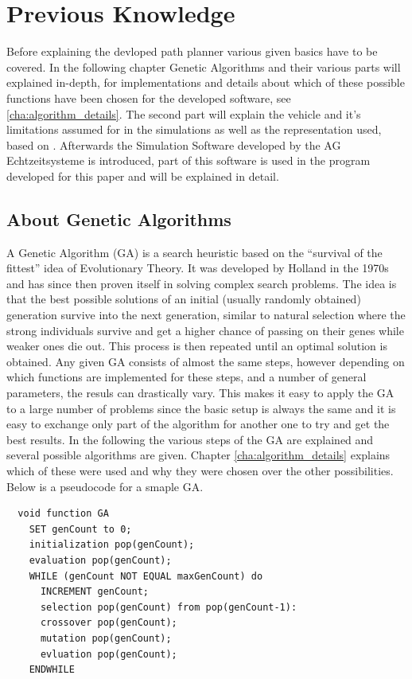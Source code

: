 \chapter{Previous Knowledge}
\label{cha:previous_knowledge}

Before explaining the devloped path planner various given basics have to be covered. In the following chapter Genetic Algorithms and their various parts will explained in-depth, for implementations and details about which of these possible functions have been chosen for the developed software, see \ref{cha:algorithm_details}. The second part will explain the vehicle and it's limitations assumed for in the simulations as well as the representation used, based on \cite{12}. Afterwards the Simulation Software developed by the AG Echtzeitsysteme is introduced, part of this software is used in the program developed for this paper and will be explained in detail.

\section{About Genetic Algorithms}
\label{sec:previous_knowledge_ga}

A Genetic Algorithm (GA) is a search heuristic based on the "`survival of the fittest"' idea of Evolutionary Theory. It was developed by Holland in the 1970s \cite{15} and has since then proven itself in solving complex search problems. The idea is that the best possible solutions of an initial (usually randomly obtained) generation survive into the next generation, similar to natural selection where the strong individuals survive and get a higher chance of passing on their genes while weaker ones die out. This process is then repeated until an optimal solution is obtained. Any given GA consists of almost the same steps, however depending on which functions are implemented for these steps, and a number of general parameters, the resuls can drastically vary. This makes it easy to apply the GA to a large number of problems since the basic setup is always the same and it is easy to exchange only part of the algorithm for another one to try and get the best results. In the following the various steps of the GA are explained and several possible algorithms are given. Chapter \ref{cha:algorithm_details} explains which of these were used and why they were chosen over the other possibilities. Below is a pseudocode for a smaple GA.
\begin{verbatim}
  void function GA
    SET genCount to 0;
    initialization pop(genCount);
    evaluation pop(genCount);
    WHILE (genCount NOT EQUAL maxGenCount) do
      INCREMENT genCount;
      selection pop(genCount) from pop(genCount-1):
      crossover pop(genCount);
      mutation pop(genCount);
      evluation pop(genCount);
    ENDWHILE
\end{verbatim}

